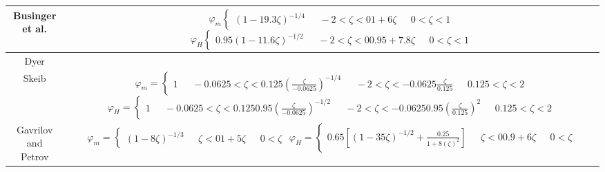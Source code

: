 {\begin{table}[p]
\begin{tabular}{| c | c |}
                        \hline
        \shortstack{Businger et al. \\ \citep{businger:1971}}  & \shortstack{$\varphi_{m} \begin{cases} (1 - 19.3 \zeta)^{-1/4} & \text{    } -2 < \zeta < 0 \\ 1 + 6\zeta & \text{    } 0 < \zeta < 1 \\ \end{cases}$\\$\varphi_{H} \begin{cases} 0.95(1 - 11.6 \zeta)^{-1/2} & \text{    } -2 < \zeta < 0 \\ 0.95 + 7.8\zeta & \text{    } 0 < \zeta < 1 \\ \end{cases}$ } \\ 
                \hline
       \shortstack{Dyer \\ \citep{dyer:1974}} & \shortstack{$\varphi_{m} \begin{cases} (1 - 15.2 \zeta)^{-1/2} & \text{    } -1 < \zeta < 0 \\ 1 + 4.8\zeta & \text{    } 0 < \zeta \\  \end{cases}$ } \\ 
               \hline
        \shortstack{Skeib \\ \citep{foken:1990}} & \shortstack{$\varphi_{m} = \begin{cases} 1 & \text{    } -0.0625 < \zeta < 0.125 \\ (\frac{\zeta}{-0.0625})^{-1/4} & \text{    } -2 < \zeta < -0.0625 \\ \frac{\zeta}{0.125} & \text{    } 0.125 < \zeta < 2 \\ \end{cases}$\\$\varphi_{H} = \begin{cases} 1 & \text{    } -0.0625 < \zeta < 0.125 \\ 0.95(\frac{\zeta}{-0.0625})^{-1/2} & \text{    } -2 < \zeta < -0.0625 \\ 0.95(\frac{\zeta}{0.125})^{2} & \text{    } 0.125 < \zeta < 2 \\ \end{cases}$ } \\ 
              \hline
       \shortstack{Gavrilov and \\ Petrov \\ \citep{gavrilov:1981}}  & \shortstack{$\varphi_{m} = \begin{cases} (1-8\zeta)^{-1/3} & \text{    } \zeta < 0\\ 1 + 5 \zeta & \text{    } 0 < \zeta\\ \end{cases}$\\$\varphi_{H} = \begin{cases} 0.65 \left[ (1-35\zeta)^{-1/2} + \frac{0.25}{1+8(\zeta)^{2}} \right] & \text{    } \zeta < 0\\ 0.9 + 6 \zeta & \text{    } 0 < \zeta\\ \end{cases}$ } \\ 

\end{tabular}
\end{table}}
